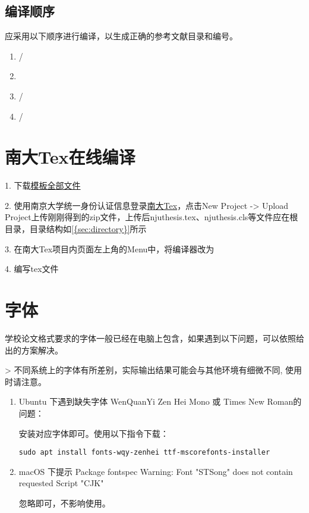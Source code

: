 \subsection{编译顺序}
应采用以下顺序进行编译，以生成正确的参考文献目录和编号。
\begin{enumerate}
    \item {}/
    \item {}
    \item {}/
    \item {}/
\end{enumerate}

\section{南大Tex在线编译}

1. 下载\href{https://github.com/nju-lug/NJUThesisUndergraduate/archive/refs/heads/master.zip}{模板全部文件}

2. 使用南京大学统一身份认证信息登录\href{https://tex.nju.edu.cn}{南大Tex}，点击New Project -> Upload Project上传刚刚得到的zip文件，上传后njuthesis.tex、njuthesis.cls等文件应在根目录，目录结构如\cref{{sec:directory}}所示

3. 在南大Tex项目内页面左上角的Menu中，将编译器改为

4. 编写tex文件


\section{字体}

学校论文格式要求的字体一般已经在电脑上包含，如果遇到以下问题，可以依照给出的方案解决。

> 不同系统上的字体有所差别，实际输出结果可能会与其他环境有细微不同, 使用时请注意。

\begin{enumerate}
    \item Ubuntu 下遇到缺失字体 WenQuanYi Zen Hei Mono 或 Times New Roman的问题：
    
       安装对应字体即可。使用以下指令下载：
       
       \begin{lstlisting}
sudo apt install fonts-wqy-zenhei ttf-mscorefonts-installer
        \end{lstlisting}

    \item macOS 下提示 Package fontspec Warning: Font "STSong" does not contain requested Script "CJK"

       忽略即可，不影响使用。
\end{enumerate}

